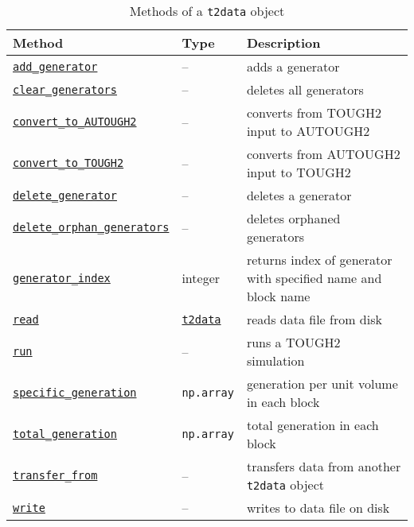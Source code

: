 \begin{table}
  \begin{center}
    \begin{tabular}{|l|l|p{65mm}|}
      \hline
      \textbf{Method} & \textbf{Type} & \textbf{Description}\\
      \hline
      \hyperref[sec:t2data:add_generator]{\texttt{add\_generator}} & -- & adds a generator\\
      \hyperref[sec:t2data:clear_generators]{\texttt{clear\_generators}} & -- & deletes all generators\\
      \hyperref[sec:t2data:convert_to_AUTOUGH2]{\texttt{convert\_to\_AUTOUGH2}} & -- & converts from TOUGH2 input to AUTOUGH2\\
      \hyperref[sec:t2data:convert_to_TOUGH2]{\texttt{convert\_to\_TOUGH2}} & -- & converts from AUTOUGH2 input to TOUGH2\\
      \hyperref[sec:t2data:delete_generator]{\texttt{delete\_generator}} & -- & deletes a generator\\
      \hyperref[sec:t2data:delete_orphan_generators]{\texttt{delete\_orphan\_generators}} & -- & deletes orphaned generators\\
      \hyperref[sec:t2data:generator_index]{\texttt{generator\_index}} & integer & returns index of generator with specified name and block name\\
      \hyperref[sec:t2data:read]{\texttt{read}} & \hyperref[datafiles]{\texttt{t2data}} & reads data file from disk\\
      \hyperref[sec:t2data:run]{\texttt{run}} & -- & runs a TOUGH2 simulation\\
      \hyperref[sec:t2data:specific_generation]{\texttt{specific\_generation}} & \texttt{np.array} & generation per unit volume in each block\\
      \hyperref[sec:t2data:total_generation]{\texttt{total\_generation}} & \texttt{np.array} & total generation in each block\\
      \hyperref[sec:t2data:transfer_from]{\texttt{transfer\_from}} & -- & transfers data from another \texttt{t2data} object\\
      \hyperref[sec:t2data:write]{\texttt{write}} & -- & writes to data file on disk\\
      \hline
    \end{tabular}
    \caption{Methods of a \texttt{t2data} object}
    \label{tb:t2data_methods}
  \end{center}
\end{table}

